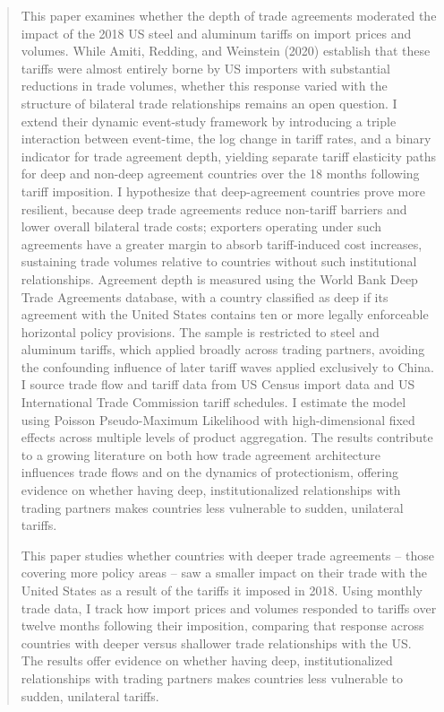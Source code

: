\begin{abstract}
This paper examines whether the depth of trade agreements moderated the impact of the 2018 US steel and aluminum tariffs on import prices and volumes. While Amiti, Redding, and Weinstein (2020) establish that these tariffs were almost entirely borne by US importers with substantial reductions in trade volumes, whether this response varied with the structure of bilateral trade relationships remains an open question. I extend their dynamic event-study framework by introducing a triple interaction between event-time, the log change in tariff rates, and a binary indicator for trade agreement depth, yielding separate tariff elasticity paths for deep and non-deep agreement countries over the 18 months following tariff imposition. I hypothesize that deep-agreement countries prove more resilient, because deep trade agreements reduce non-tariff barriers and lower overall bilateral trade costs; exporters operating under such agreements have a greater margin to absorb tariff-induced cost increases, sustaining trade volumes relative to countries without such institutional relationships. Agreement depth is measured using the World Bank Deep Trade Agreements database, with a country classified as deep if its agreement with the United States contains ten or more legally enforceable horizontal policy provisions. The sample is restricted to steel and aluminum tariffs, which applied broadly across trading partners, avoiding the confounding influence of later tariff waves applied exclusively to China. I source trade flow and tariff data from US Census import data and US International Trade Commission tariff schedules. I estimate the model using Poisson Pseudo-Maximum Likelihood with high-dimensional fixed effects across multiple levels of product aggregation. The results contribute to a growing literature on both how trade agreement architecture influences trade flows and on the dynamics of protectionism, offering evidence on whether having deep, institutionalized relationships with trading partners makes countries less vulnerable to sudden, unilateral tariffs.

This paper studies whether countries with deeper trade agreements – those covering more policy areas – saw a smaller impact on their trade with the United States as a result of the tariffs it imposed in 2018. Using monthly trade data, I track how import prices and volumes responded to tariffs over twelve months following their imposition, comparing that response across countries with deeper versus shallower trade relationships with the US. The results offer evidence on whether having deep, institutionalized relationships with trading partners makes countries less vulnerable to sudden, unilateral tariffs.


\end{abstract}
